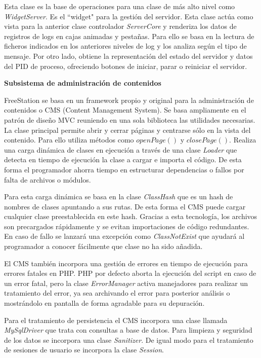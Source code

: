 Esta clase es la base de operaciones para una clase de más alto nivel como
\emph{WidgetServer}. Es el ``widget" para la gestión del servidor. Esta clase
actúa como vista para la anterior clase controlador \emph{ServerCore} y 
renderiza los datos de registros de logs en cajas animadas y pestañas. Para ello
se basa en la lectura de ficheros indicados en los anteriores niveles de log y 
los analiza según el tipo de mensaje. Por otro lado, obtiene la representación 
del estado del servidor y datos del PID de proceso, ofreciendo botones de
iniciar, parar o reiniciar el servidor.

\textbf{Subsistema de administración de contenidos}

FreeStation se basa en un framework propio y original para la administración de
contenidos o CMS (Content Management System). Se basa ampliamente en el patrón
de diseño MVC reuniendo en una sola biblioteca las utilidades necesarias. La
clase principal permite abrir y cerrar páginas y centrarse sólo en la vista 
del contenido. Para ello utiliza métodos como $openPage()$ y
$closePage()$. Realiza una carga dinámica de clases en ejecución a través de una
clase \emph{Loader} que detecta en tiempo de ejecución la clase a cargar e
importa el código. De esta forma el programador ahorra tiempo en estructurar 
dependencias o fallos por falta de archivos o módulos.

Para esta carga dinámica se basa en la clase \emph{ClassHash} que es un hash de
nombres de clases apuntando a sus rutas. De esta forma el CMS puede cargar
cualquier clase preestablecida en este hash.
Gracias a esta tecnología, los archivos son precargados rápidamente y se evitan
importaciones de código redundantes. En caso de fallo se lanzará una excepción
como \emph{ClassNotExist} que ayudará al programador a conocer fácilmente que
clase no ha sido añadida.

El CMS también incorpora una gestión de errores en tiempo de ejecución para
errores fatales en PHP. PHP por defecto aborta la ejecución del script en caso
de un error fatal, pero la clase \emph{ErrorManager} activa manejadores para
realizar un tratamiento del error, ya sea archivando el error para posterior
análisis o mostrándolo en pantalla de forma agradable para su depuración.

Para el tratamiento de persistencia el CMS incorpora una clase llamada
\emph{MySqlDriver} que trata con consultas a base de datos. Para limpieza y
seguridad de los datos se incorpora una clase \emph{Sanitizer}. De igual modo
para el tratamiento de sesiones de usuario se incorpora la clase \emph{Session}.

